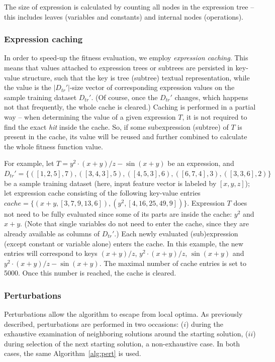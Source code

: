 \documentclass[a4paper,12pt]{elsarticle}
\begin{document}
The size of expression is calculated by counting all nodes in the expression tree -- this includes leaves (variables and constants) and internal nodes (operations). 

\subsubsection{Expression caching}

In order to speed-up the fitness evaluation, we employ \emph{expression caching}. This means that values attached to expression trees or subtrees are persisted in key-value structure, such that the key is tree (subtree) textual representation, while the value is the $|D_{tr}'|$-size  vector of corresponding expression values on the sample training dataset $D_{tr}'$. (Of course, once the $D_{tr}'$ changes, which happens not that frequently, the whole cache is cleared.) 
Caching is performed in a partial way -- when determining the value of a given expression $T$, it is not required to find the exact \emph{hit} inside the cache. So, if some subexpression (subtree) of $T$ is present in the cache, its value will be reused and further combined to calculate the whole fitness function value. 

For example, let  $T = y^2 \cdot (x+y)/z - \sin(x+y)$ be an expression, and $D_{tr}'=\{([1, 2, 5], 7), ([3, 4, 3], 5), ([4, 5, 3], 6), ([6, 7, 4], 3), ([3, 3, 6], 2)\}$ be a sample training dataset (here, input feature vector is labeled by $[x, y, z]$); let expression cache consisting of the following key-value entries $cache=\{(x+y, [3, 7, 9, 13, 6]), (y^2, [4, 16, 25, 49, 9])\}$.  
Expression $T$ does not need to be fully evaluated since some of its parts are inside the cache: $y^2$ and $x+y$. (Note that single variables do not need to enter the cache, since they are already available as columns of  $D_{tr}'$.)
Each newly evaluated (sub)expression (except constant or variable alone) enters the cache. In this example, the new entries will correspond to keys $(x+y)/z$, $y^2 \cdot (x+y)/z$, $\sin(x+y)$ and $y^2 \cdot (x+y)/z - \sin(x+y)$.  
The maximal number of cache entries is set to 5000. Once this number is reached, the cache is cleared. 

\subsubsection{Perturbations}\label{sec:pertGen}

Perturbations allow the algorithm to escape from local optima. As previously described, perturbations are performed in two occasions: ($i$) during the exhaustive examination of neighboring solutions around the starting solution, ($ii$) during selection of the next starting solution, a non-exhaustive case.  
In both cases, the same Algorithm~\ref{alg:pert} is used. 
\end{document}
